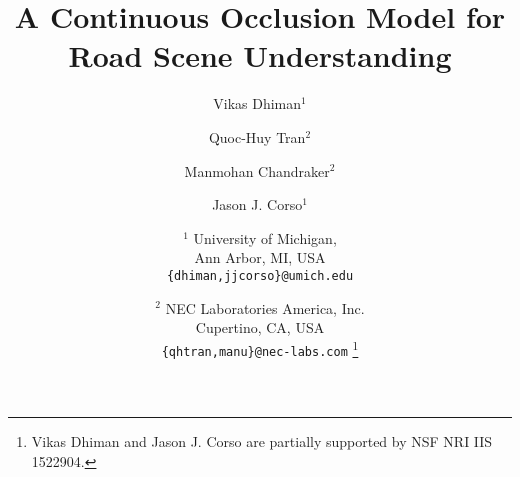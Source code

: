 \documentclass[10pt,twocolumn,letterpaper]{article}
\begin{document}
\title{A Continuous Occlusion Model for Road Scene Understanding}

\author{Vikas Dhiman$^1$
\and
Quoc-Huy Tran$^2$
\and
Manmohan Chandraker$^2$
\and
Jason J. Corso$^1$
\and
$^1$ University of Michigan,\\
Ann Arbor, MI, USA\\
{\tt\small \{dhiman,jjcorso\}@umich.edu}
\and
$^2$ NEC Laboratories America, Inc.\\
Cupertino, CA, USA\\
{\tt\small \{qhtran,manu\}@nec-labs.com}
\thanks{Vikas Dhiman and Jason J. Corso are partially supported by NSF NRI IIS
1522904.}
}

\maketitle






%











{\small


}
\end{document}
